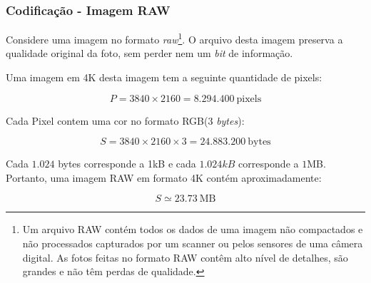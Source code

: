 \documentclass[10pt]{beamer}
\begin{document}
\begin{frame}[t]
\begin{center}
    \end{center}
\end{frame}

\def\nota1{Um arquivo RAW contém todos os dados de uma imagem não compactados e não processados capturados por um scanner ou pelos sensores de uma câmera digital. As fotos feitas no formato RAW contêm alto nível de detalhes, são grandes e não têm perdas de qualidade.}
\begin{frame}[t]
    \frametitle{Codificação - Imagem RAW}
    Considere uma imagem no formato \emph{raw}\footnote{\nota1}. O arquivo desta imagem preserva a qualidade original da foto, sem perder nem um \emph{bit} de informação.\vfill

    Uma imagem em 4K desta imagem tem a seguinte quantidade de pixels:

    \[P =  3840 \times 2160 = 8.294.400\ \text{pixels}\]

    \vfill

    Cada Pixel contem uma cor no formato RGB(3 \emph{bytes}):

    \[S = 3840 \times 2160 \times 3 = 24.883.200\ \text{bytes}\]

    \vfill

    Cada $1.024$ bytes corresponde a 1kB e cada $1.024kB$ corresponde a $1$MB. Portanto, uma imagem RAW em formato 4K contém aproximadamente:

    \[S \simeq 23.73\ \text{MB}\]
\end{frame}
\end{document}
